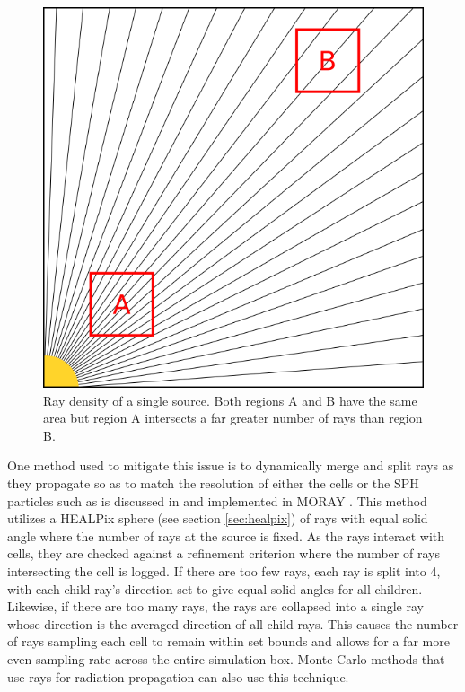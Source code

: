 \begin{figure} [H]
    \centering
    \includegraphics[width=\textwidth]{plots/CH2/rayDensityComparison.png}
    \caption{Ray density of a single source. Both regions A and B have the same area but region A intersects a far greater number of rays than region B.}
    \label{rayfig}
\end{figure}

One method used to mitigate this issue is to dynamically merge and split rays as they propagate so as to match the resolution of either the cells or the SPH particles such as is discussed in \citep{MORAYish} and implemented in MORAY \citep{moray}. This method utilizes a HEALPix sphere (see section \ref{sec:healpix}) of rays with equal solid angle where the number of rays at the source is fixed. As the rays interact with cells, they are checked against a refinement criterion where the number of rays intersecting the cell is logged. If there are too few rays, each ray is split into 4, with each child ray's direction set to give equal solid angles for all children. Likewise, if there are too many rays, the rays are collapsed into a single ray whose direction is the averaged direction of all child rays. This causes the number of rays sampling each cell to remain within set bounds and allows for a far more even sampling rate across the entire simulation box. Monte-Carlo methods that use rays for radiation propagation can also use this technique. 


